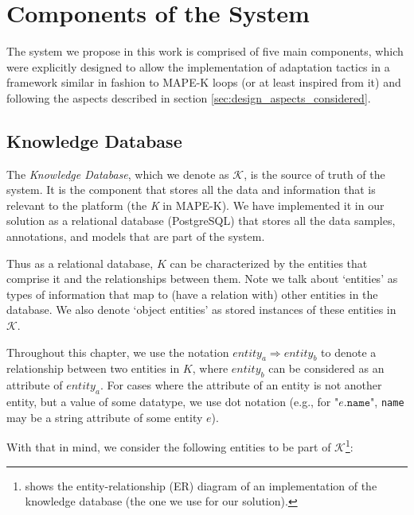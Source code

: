 \documentclass[../main.tex]{subfiles}
\begin{document}
    
    
    \section{Components of the System} \label{sec:system_components}

    The system we propose in this work is comprised of five main components, which were explicitly designed to allow the implementation of adaptation tactics in a framework similar in fashion to MAPE-K loops (or at least inspired from it) and following the aspects described in section \ref{sec:design_aspects_considered}.
    
    
    \subsection{Knowledge Database} \label{sec:knowledge_db}

    The \textit{Knowledge Database}, which we denote as $\mathcal{K}$, is the source of truth of the system. It is the component that stores all the data and information that is relevant to the platform (the \textit{K} in MAPE-K). We have implemented it in our solution as a relational database (PostgreSQL) that stores all the data samples, annotations, and models that are part of the system.

    Thus as a relational database, $K$ can be characterized by the entities that comprise it and the relationships between them. Note we talk about `entities' as types of information that map to (have a relation with) other entities in the database. We also denote `object entities' as stored instances of these entities in $\mathcal{K}$.
    
    Throughout this chapter, we use the notation $entity_a \Rightarrow entity_b$ to denote a relationship between two entities in $K$, where $entity_b$ can be considered as an attribute of $entity_a$. For cases where the attribute of an entity is not another entity, but a value of some datatype, we use dot notation (e.g., for "$e.\texttt{name}$", \texttt{name} may be a string attribute of some entity $e$).

    With that in mind, we consider the following entities to be part of $\mathcal{K}$\footnote{  shows the entity-relationship (ER) diagram of an implementation of the knowledge database (the one we use for our solution).}:

    \vspace{0.3cm}
    
\end{document}
